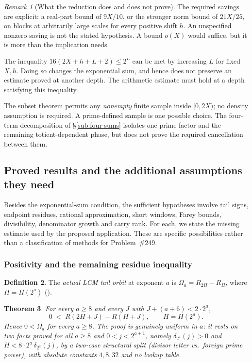 \documentclass[11pt]{article}
\theoremstyle{plain}
\newtheorem{thm}{Theorem}[section]
\theoremstyle{definition}
\newtheorem{defn}[thm]{Definition}
\theoremstyle{remark}
\newtheorem{rem}[thm]{Remark}
\newcommand{\lean}[2]{\leanlink{#2}}
\begin{document}
\begin{rem}[What the reduction does and does not prove]
The required savings are explicit: a real-part bound of $9X/10$, or
the stronger norm bound of $21X/25$, on blocks at arbitrarily large
scales for every positive shift $h$. An unspecified nonzero saving is
not the stated hypothesis. A bound $o(X)$ would suffice, but it is more
than the implication needs.

The inequality $16(2X+h+L+2)\le2^L$ can be met by increasing $L$ for
fixed $X,h$. Doing so changes the exponential sum, and hence does not
preserve an estimate proved at another depth. The arithmetic estimate
must hold at a depth satisfying this inequality.

The subset theorem permits any \emph{nonempty} finite sample inside
$[0,2X)$; no density assumption is required. A prime-defined sample is
one possible choice. The four-term decomposition of
\S\ref{sub:four-sums} isolates one prime
factor and the remaining totient-dependent phase, but does not prove
the required cancellation between them.
\end{rem}

\subsection{Proved results and the additional assumptions they need}

Besides the exponential-sum condition, the sufficient hypotheses
involve tail signs, endpoint residues, rational approximation, short
windows, Farey bounds, divisibility, denominator growth and carry rank.
For each, we state the missing estimate used by the proposed
application. These are specific possibilities rather than a
classification of methods for Problem~\#249.

\subsubsection{Positivity and the remaining residue inequality}

\begin{defn}
The \emph{actual LCM tail orbit} at exponent $a$ is
$\Omega_a = R_{2H}-R_H$, where $H = {H}(2^a)$
(\lean{actualLcmTailOrbit_pos}{TotientActualLcmOrbitSign.lean:144}).
\end{defn}

\begin{thm}\label{thm:positivity-remaining-residue-inequality}
For every $a\ge 8$ and every $J$ with $J+(a{+}6) < 2\cdot 2^a$,
\[
  0 \;<\; {R}(2H{+}J) - {R}(H{+}J), \qquad H={H}(2^a).
\]
Hence $0 < \Omega_a$ for every $a\ge 8$. The proof is genuinely uniform in
$a$: it rests on two facts proved for all $a\ge 8$ and $0<j<2^{a+1}$, namely $\delta_{2^a}(j)>0$ and $H<8\cdot 2^a\,\delta_{2^a}(j)$, by a two-case structural split (divisor letter
vs.\ foreign prime power), with absolute constants $4,8,32$ and no lookup table.
\end{thm}
\end{document}
